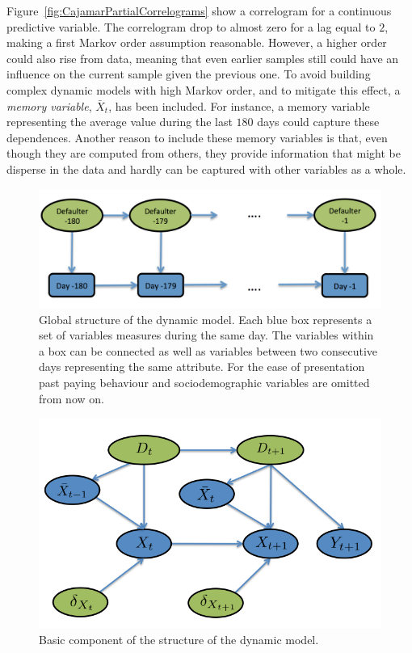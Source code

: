 Figure~\ref{fig:CajamarPartialCorrelograms} show a correlogram for a continuous predictive variable. The correlogram drop to almost zero for a lag equal to $2$, making a first Markov order assumption reasonable. However, a higher order could also rise from data, meaning that even earlier samples still could have an influence on the current sample given the previous one. 
To avoid building complex dynamic models with high Markov order, and to mitigate this effect,  a \emph{memory variable}, $\bar{X}_t$, has been included. For instance, a memory variable representing the average value during the last $180$ days could capture these dependences. Another reason to include these memory variables is that, even though they are computed from others, they provide information that might be disperse in the data and hardly can be captured with other variables as a whole. 

\begin{figure}[htbp]
\begin{center}
\includegraphics[scale=0.45]{./figures/CajaMarModel1}
\caption{Global structure of the dynamic model. Each blue box represents a set of variables measures during the same day.
The variables within a box can be connected as well as variables between two consecutive days representing the same attribute. For the ease of presentation past paying behaviour and sociodemographic variables are omitted from now on.}
\label{fig:global_temp}
\end{center}
\end{figure}

\begin{figure}[htbp]
\begin{center}
\includegraphics[scale=0.45]{./figures/CajaMarModel2}
\caption{Basic component of the structure of the dynamic model.}
\label{fig:component}
\end{center}
\end{figure}

